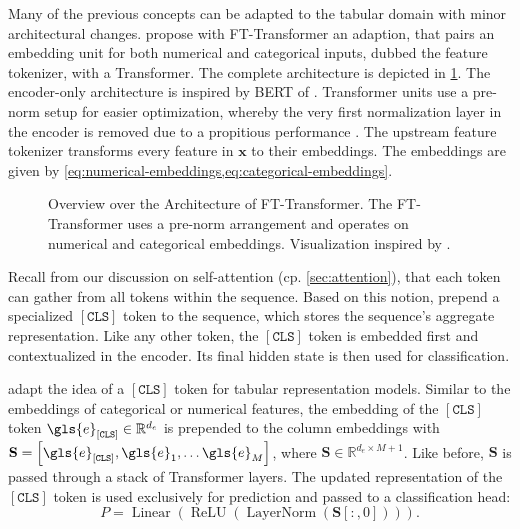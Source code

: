 Many of the previous concepts can be adapted to the tabular domain with minor architectural changes. \textcite[][18935]{gorishniyRevisitingDeepLearning2021} propose with FT-Transformer an adaption, that pairs an embedding unit for both numerical and categorical inputs, dubbed the feature tokenizer, with a Transformer. The complete architecture is depicted in \cref{fig:fttransformer}. The encoder-only architecture is inspired by \gls{BERT} of \textcite[][4173--4174]{devlinBERTPretrainingDeep2019}. Transformer units use a pre-norm setup for easier optimization, whereby the very first normalization layer in the encoder is removed due to a propitious performance \textcite[][18948]{gorishniyRevisitingDeepLearning2021}. The upstream feature tokenizer transforms every feature in $\mathbf{x}$ to their embeddings. The embeddings are given by \cref{eq:numerical-embeddings,eq:categorical-embeddings}.

\begin{figure}[ht]
    \centering
    {\renewcommand\normalsize{\scriptsize}
        \normalsize
        }
    \caption[Overview Over the FT-Transformer Architecture]{Overview over the Architecture of FT-Transformer. The FT-Transformer uses a pre-norm arrangement and operates on numerical and categorical embeddings. Visualization inspired by \textcite[][18935--18936]{gorishniyRevisitingDeepLearning2021}.}
    \label{fig:fttransformer}
\end{figure}

Recall from our discussion on self-attention (cp. \cref{sec:attention}), that each \gls{token} can gather from all \glspl{token} within the sequence. Based on this notion, \textcite[][4174]{devlinBERTPretrainingDeep2019} prepend a specialized $\mathtt{[CLS]}$ \gls{token} to the sequence, which stores the sequence's aggregate representation. Like any other \gls{token}, the $\mathtt{[CLS]}$ \gls{token} is embedded first and contextualized in the encoder. Its final hidden state is then used for classification.

\textcite[][18935]{gorishniyRevisitingDeepLearning2021} adapt the idea of a $\mathtt{[CLS]}$ \gls{token} for tabular representation models. Similar to the embeddings of categorical or numerical features, the embedding of the $[\mathtt{CLS}]$ \gls{token} $\gls{e}_\mathtt{[CLS]} \in \mathbb{R}^{d_{e}}$ is prepended to the column embeddings with $\mathbf{S} = \left[\gls{e}_\mathtt{[CLS]}, \gls{e}_1, \ldots \gls{e}_{M}\right]$, where $\mathbf{S} \in \mathbb{R}^{d_{e} \times M +1}$. Like before, $\mathbf{S}$ is passed through a stack of Transformer layers. The updated representation of the $\mathtt{[CLS]}$ \gls{token} is used exclusively for prediction and passed to a classification head:
\begin{equation}
    P=\operatorname{Linear}\left(\operatorname{ReLU}\left(\operatorname{LayerNorm}\left(\mathbf{S}\left[:,0\right]\right)\right)\right).
    \label{eq:bert-ft}
\end{equation}

